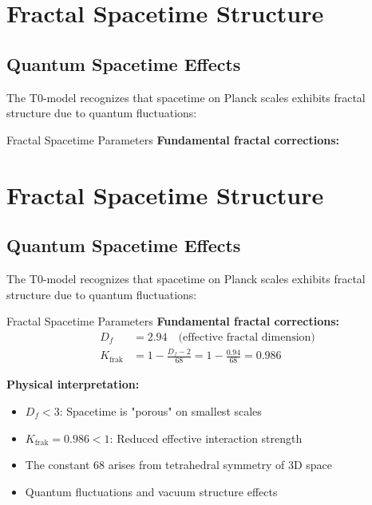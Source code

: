 \documentclass[12pt,a4paper]{article}
\begin{document}
	\section{Fractal Spacetime Structure}
	\label{sec:fractal_spacetime}
	
	\subsection{Quantum Spacetime Effects}
	\label{subsec:quantum_spacetime}
	
	The T0-model recognizes that spacetime on Planck scales exhibits fractal structure due to quantum fluctuations:
	
	\begin{fractal}{Fractal Spacetime Parameters}{}
		\textbf{Fundamental fractal corrections:}

	\section{Fractal Spacetime Structure}
	\label{sec:fractal_spacetime}
	
	\subsection{Quantum Spacetime Effects}
	\label{subsec:quantum_spacetime}
	
	The T0-model recognizes that spacetime on Planck scales exhibits fractal structure due to quantum fluctuations:
	
	\begin{fractal}{Fractal Spacetime Parameters}{}
		\textbf{Fundamental fractal corrections:}
		\begin{align}
			D_f &= 2.94 \quad \text{(effective fractal dimension)} \\
			K_{\text{frak}} &= 1 - \frac{D_f - 2}{68} = 1 - \frac{0.94}{68} = 0.986
		\end{align}
		
		\textbf{Physical interpretation:}
		\begin{itemize}
			\item $D_f < 3$: Spacetime is "porous" on smallest scales
			\item $K_{\text{frak}} = 0.986 < 1$: Reduced effective interaction strength
			\item The constant 68 arises from tetrahedral symmetry of 3D space
			\item Quantum fluctuations and vacuum structure effects
		\end{itemize}
	\end{fractal}
	

\end{fractal}
\end{document}
